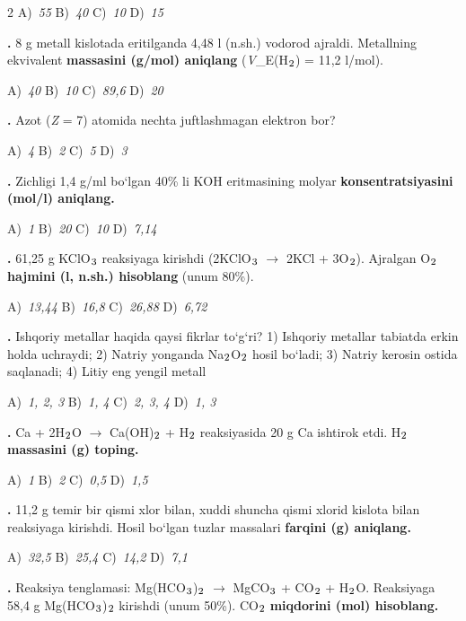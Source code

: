 \documentclass[11pt,a4paper]{article}
\renewcommand{\textsubscript}[1]{\ensuremath{_{\text{\fontsize{8}{8}\selectfont #1}}}}
\newcommand{\qn}[1]{\textbf{\fontsize{11.5}{13}\selectfont #1}}
\newcommand{\qsep}{\par\vspace{1pt}\noindent\rule{0pt}{0.4pt}\par\vspace{5pt}}
\begin{document}
\begin{multicols}{2}
\noindent A)~\textsl{55} \hfill B)~\textsl{40} \hfill C)~\textsl{10} \hfill D)~\textsl{15}\par
\qsep
\noindent\qn{10.} 8 g metall kislotada eritilganda 4,48 l (n.sh.) vodorod ajraldi. Metallning ekvivalent \textbf{massasini (g/mol) aniqlang} (\textit{V}\_E(H\textsubscript{2}) = 11,2 l/mol).

\noindent A)~\textsl{40} \hfill B)~\textsl{10} \hfill C)~\textsl{89,6} \hfill D)~\textsl{20}\par
\qsep
\noindent\qn{11.} Azot (\textit{Z} = 7) atomida nechta juftlashmagan elektron bor?

\noindent A)~\textsl{4} \hfill B)~\textsl{2} \hfill C)~\textsl{5} \hfill D)~\textsl{3}\par
\qsep
\noindent\qn{12.} Zichligi 1,4 g/ml bo`lgan 40\% li KOH eritmasining molyar \textbf{konsentratsiyasini (mol/l) aniqlang.}

\noindent A)~\textsl{1} \hfill B)~\textsl{20} \hfill C)~\textsl{10} \hfill D)~\textsl{7,14}\par
\qsep
\noindent\qn{13.} 61,25 g KClO\textsubscript{3} reaksiyaga kirishdi (2KClO\textsubscript{3} $\to$ 2KCl + 3O\textsubscript{2}). Ajralgan O\textsubscript{2} \textbf{hajmini (l, n.sh.) hisoblang} (unum 80\%).

\noindent A)~\textsl{13,44} \hfill B)~\textsl{16,8} \hfill C)~\textsl{26,88} \hfill D)~\textsl{6,72}\par
\qsep
\noindent\qn{14.} Ishqoriy metallar haqida qaysi fikrlar to`g`ri? 1) Ishqoriy metallar tabiatda erkin holda uchraydi; 2) Natriy yonganda Na\textsubscript{2}O\textsubscript{2} hosil bo`ladi; 3) Natriy kerosin ostida saqlanadi; 4) Litiy eng yengil metall

\noindent A)~\textsl{1, 2, 3} \hfill B)~\textsl{1, 4} \hfill C)~\textsl{2, 3, 4} \hfill D)~\textsl{1, 3}\par
\qsep
\noindent\qn{15.} Ca + 2H\textsubscript{2}O $\to$ Ca(OH)\textsubscript{2} + H\textsubscript{2} reaksiyasida 20 g Ca ishtirok etdi. H\textsubscript{2} \textbf{massasini (g) toping.}

\noindent A)~\textsl{1} \hfill B)~\textsl{2} \hfill C)~\textsl{0,5} \hfill D)~\textsl{1,5}\par
\qsep
\noindent\qn{16.} 11,2 g temir bir qismi xlor bilan, xuddi shuncha qismi xlorid kislota bilan reaksiyaga kirishdi. Hosil bo`lgan tuzlar massalari \textbf{farqini (g) aniqlang.}

\noindent A)~\textsl{32,5} \hfill B)~\textsl{25,4} \hfill C)~\textsl{14,2} \hfill D)~\textsl{7,1}\par
\qsep
\noindent\qn{17.} Reaksiya tenglamasi: Mg(HCO\textsubscript{3})\textsubscript{2} $\to$ MgCO\textsubscript{3} + CO\textsubscript{2} + H\textsubscript{2}O. Reaksiyaga 58,4 g Mg(HCO\textsubscript{3})\textsubscript{2} kirishdi (unum 50\%). CO\textsubscript{2} \textbf{miqdorini (mol) hisoblang.}


\end{multicols}
\end{document}
